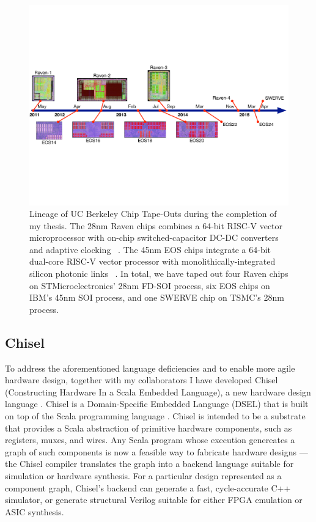 \begin{figure}[t!]
\centering
\vspace{-0.15in}
\includegraphics[width=\columnwidth]{intro/figures/tapeouts.pdf}
\vspace{-0.3in}
\caption{Lineage of UC Berkeley Chip Tape-Outs during the completion of my thesis.
The 28nm Raven chips combines a 64-bit RISC-V vector microprocessor with on-chip switched-capacitor DC-DC converters and adaptive clocking ~\cite{zimmer2015raven}.
The 45nm EOS chips integrate a 64-bit dual-core RISC-V vector processor with monolithically-integrated silicon photonic links ~\cite{lee2014eos}.
In total, we have taped out
four Raven chips on STMicroelectronics' 28nm FD-SOI process,
six EOS chips on IBM's 45nm SOI process,
and one SWERVE chip on TSMC's 28nm process. 
}
\label{fig:tapeouts}
\vspace{-0.1in}
\end{figure}

\subsection{Chisel}

To address the aforementioned language deficiencies and to enable more agile hardware design, together with my collaborators I have developed Chisel (Constructing Hardware In a Scala Embedded Language), a new hardware design language \cite{chisel}.
Chisel is a Domain-Specific Embedded Language (DSEL) that is built on top of the Scala programming language \cite{scala}.
Chisel is intended to be a substrate that provides a Scala abstraction of primitive hardware components, such as registers, muxes, and wires.
Any Scala program whose execution genereates a graph of such components is now a feasible way to fabricate hardware designs --- the Chisel compiler translates the graph into a backend language suitable for simulation or hardware synthesis.
For a particular design represented as a component graph, Chisel's backend can generate a fast, cycle-accurate C++ simulator, or generate structural Verilog suitable for either FPGA emulation or ASIC synthesis.

